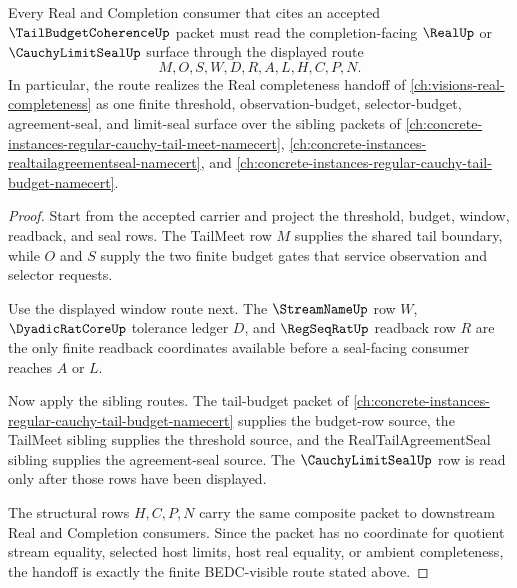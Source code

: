 \begin{theorem}
\label{thm:tail-budget-coherence-real-completion-handoff}
Every Real and Completion consumer that cites an accepted $\TailBudgetCoherenceUp$ packet must read the completion-facing $\RealUp$ or $\CauchyLimitSealUp$ surface through the displayed route
$$
M,O,S,W,D,R,A,L,H,C,P,N.
$$
In particular, the route realizes the Real completeness handoff of \autoref{ch:visions-real-completeness} as one finite threshold, observation-budget, selector-budget, agreement-seal, and limit-seal surface over the sibling packets of \autoref{ch:concrete-instances-regular-cauchy-tail-meet-namecert}, \autoref{ch:concrete-instances-realtailagreementseal-namecert}, and \autoref{ch:concrete-instances-regular-cauchy-tail-budget-namecert}.
\end{theorem}
\begin{proof}
Start from the accepted carrier and project the threshold, budget, window, readback, and seal rows. The TailMeet row $M$ supplies the shared tail boundary, while $O$ and $S$ supply the two finite budget gates that service observation and selector requests.

Use the displayed window route next. The $\StreamNameUp$ row $W$, $\DyadicRatCoreUp$ tolerance ledger $D$, and $\RegSeqRatUp$ readback row $R$ are the only finite readback coordinates available before a seal-facing consumer reaches $A$ or $L$.

Now apply the sibling routes. The tail-budget packet of \autoref{ch:concrete-instances-regular-cauchy-tail-budget-namecert} supplies the budget-row source, the TailMeet sibling supplies the threshold source, and the RealTailAgreementSeal sibling supplies the agreement-seal source. The $\CauchyLimitSealUp$ row is read only after those rows have been displayed.

The structural rows $H,C,P,N$ carry the same composite packet to downstream Real and Completion consumers. Since the packet has no coordinate for quotient stream equality, selected host limits, host real equality, or ambient completeness, the handoff is exactly the finite BEDC-visible route stated above.
\end{proof}

